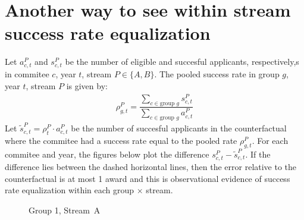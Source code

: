 \documentclass[11pt,reqno]{amsart}
\theoremstyle{definition}
\begin{document}
% 


% 



% 

\newpage
\section{Another way to see within stream success rate equalization}

\noindent Let $a^P_{c,t}$ and $s^P_{c,t}$ be the number of eligible and succesful applicants, respectively,s in commitee $c$, year $t$, stream $P\in\{A,B\}$. The pooled success rate in group $g$, year $t$, stream $P$ is given by:
\begin{align*}
    \rho^P_{g,t} = \dfrac{\sum_{c\in \text{group $g$}}s^P_{c,t}}{\sum_{c\in \text{group $g$}}a^P_{c,t}}
\end{align*}
Let $\tilde{s}^{P}_{c,t} = \rho_t^P\cdot a_{c,t}^P$ be the number of succesful applicants in the counterfactual where the commitee had a success rate equal to the pooled rate $\rho_{g,t}^P$. For each commitee and year, the figures below plot the difference $s_{c,t}^P - \tilde{s}_{c,t}^{P}$. If the difference lies between the dashed horizontal lines, then the error relative to the counterfactual is at most 1 award and this is observational evidence of success rate equalization within each group $\times$ stream. 

\begin{figure}
\centering

\caption{\footnotesize Group 1, Stream~A}
\label{fig:sshrc_awards_common_A}
\end{figure}
\end{document}
